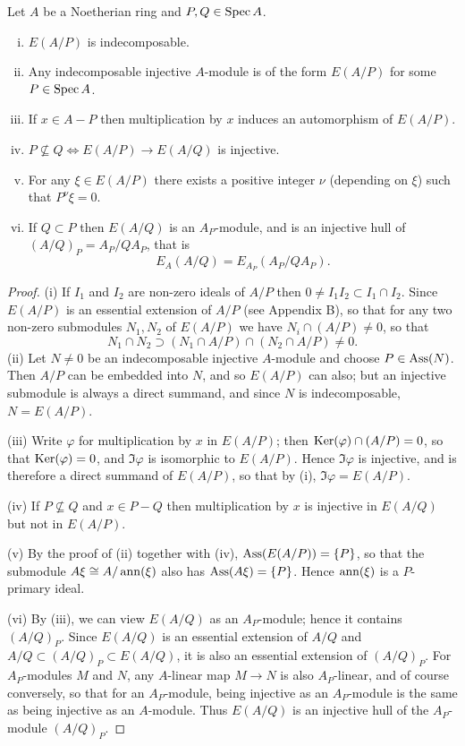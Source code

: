 \begin{theorem}\label{thm:18.4}
Let $A$ be a Noetherian ring and $P, Q \in \operatorname{Spec} A$.
\begin{enumerate}[(i)]
  \item $E(A/P)$ is indecomposable.
  \item Any indecomposable injective $A$-module is of the form $E(A/P)$ for
        some $P \in \operatorname{Spec} A$.
  \item If $x \in A - P$ then multiplication by $x$ induces an automorphism of $E(A/P)$.
  \item $P \nsubseteq Q \iff E(A/P) \to E(A/Q)$ is injective.
  \item For any $\xi \in E(A/P)$ there exists a positive integer $\nu$ (depending on $\xi$)
        such that $P^\nu\xi = 0$.
  \item If $Q \subset P$ then $E(A/Q)$ is an $A_P$-module, and is an injective hull of
        $(A/Q)_P = A_P/QA_P$, that is
        \[
          E_A(A/Q) = E_{A_P}(A_P/QA_P).
        \]
\end{enumerate}
\end{theorem}

\begin{proof}
(i) If $I_1$ and $I_2$ are non-zero ideals of $A/P$ then $0 \neq I_1I_2 \subset I_1 \cap I_2$.
Since $E(A/P)$ is an essential extension of $A/P$ (see Appendix B), so that for
any two non-zero submodules $N_1, N_2$ of $E(A/P)$ we have $N_i \cap (A/P) \neq 0$, so
that
\[
  N_1 \cap N_2 \supset (N_1 \cap A/P) \cap (N_2 \cap A/P) \neq 0.
\]
(ii) Let $N \neq 0$ be an indecomposable injective $A$-module and choose
$P \in \operatorname{Ass}(N)$. Then $A/P$ can be embedded into $N$, and so $E(A/P)$ can also; but
an injective submodule is always a direct summand, and since $N$ is
indecomposable, $N = E(A/P)$.

(iii) Write $\varphi$ for multiplication by $x$ in $E(A/P)$; then $\operatorname{Ker}(\varphi) \cap (A/P) = 0$, so
that $\operatorname{Ker}(\varphi) = 0$, and $\Im \varphi$ is isomorphic to $E(A/P)$. Hence $\Im \varphi$ is injective,
and is therefore a direct summand of $E(A/P)$, so that by (i), $\Im \varphi = E(A/P)$.

(iv) If $P \nsubseteq Q$ and $x \in P - Q$ then multiplication by $x$ is injective in
$E(A/Q)$ but not in $E(A/P)$.

(v) By the proof of (ii) together with (iv), $\operatorname{Ass}(E(A/P)) = \{P\}$, so that the
submodule $A\xi \cong A/\operatorname{ann}(\xi)$ also has $\operatorname{Ass}(A\xi) = \{P\}$. Hence $\operatorname{ann}(\xi)$ is a
$P$-primary ideal.

(vi) By (iii), we can view $E(A/Q)$ as an $A_P$-module; hence it contains
$(A/Q)_P$. Since $E(A/Q)$ is an essential extension of $A/Q$ and $A/Q \subset (A/Q)_P \subset
E(A/Q)$, it is also an essential extension of $(A/Q)_P$. For $A_P$-modules $M$ and $N$,
any $A$-linear map $M \to N$ is also $A_P$-linear, and of course conversely,
so that for an $A_P$-module, being injective as an $A_P$-module is the same as
being injective as an $A$-module. Thus $E(A/Q)$ is an injective hull of the
$A_P$-module $(A/Q)_P$.
\end{proof}

